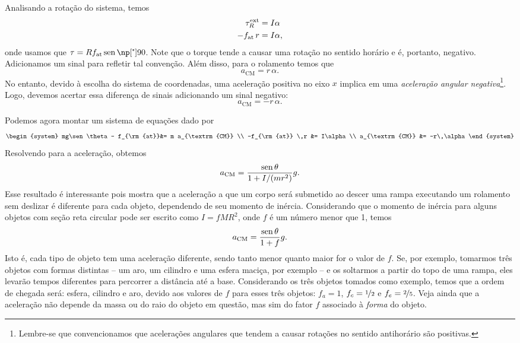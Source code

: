 Analisando a rotação do sistema, temos
\begin{align}
  \tau_R^{\rm{ext}} &= I\alpha \\
  -f_{\rm{at}} \, r &=I\alpha,
\end{align}
%
onde usamos que $\tau = R f_{\rm{at}} \sen\degree{90}$. Note que o torque tende a causar uma rotação no sentido horário e é, portanto, negativo. Adicionamos um sinal para refletir tal convenção. Além disso, para o rolamento temos que 
\begin{equation}
  a_{\textrm{CM}} = r\,\alpha.
\end{equation}
%
No entanto, devido à escolha do sistema de coordenadas, uma aceleração positiva no eixo $x$ implica em uma \emph{aceleração angular negativa}\footnote{Lembre-se que convencionamos que acelerações angulares que tendem a causar rotações no sentido antihorário são positivas.}. Logo, devemos acertar essa diferença de sinais adicionando um sinal negativo:
\begin{equation}
  a_{\textrm{CM}} = -r\,\alpha.
\end{equation}

Podemos agora montar um sistema de equações dado por
\begin{equation}
\begin{system}
    mg\sen\theta - f_{\rm{at}}&= m a_{\textrm{CM}} \\
    -f_{\rm{at}} \,r &= I\alpha \\
    a_{\textrm{CM}} &= -r\,\alpha
\end{system}
\end{equation}
%
Resolvendo para a aceleração, obtemos
\begin{equation}
  a_{\textrm{CM}} = \frac{\operatorname{sen}\theta}{1+I/(mr^2)} g.
\end{equation}
%
Esse resultado é interessante pois mostra que a aceleração a que um corpo será submetido ao descer uma rampa executando um rolamento sem deslizar é diferente para cada objeto, dependendo de seu momento de inércia. Considerando que o momento de inércia para alguns objetos com seção reta circular pode ser escrito como $I = f MR^2$, onde $f$ é um número menor que 1, temos
\begin{equation}
  a_{\textrm{CM}} = \frac{\operatorname{sen}\theta}{1+f} g.
\end{equation}
%
Isto é, cada tipo de objeto tem uma aceleração diferente, sendo tanto menor quanto maior for o valor de $f$. Se, por exemplo, tomarmos três objetos com formas distintas -- um aro, um cilindro e uma esfera maciça, por exemplo -- e os soltarmos a partir do topo de uma rampa, eles levarão tempos diferentes para percorrer a distância até a base. Considerando os três objetos tomados como exemplo, temos que a ordem de chegada será: esfera, cilindro e aro, devido aos valores de $f$ para esses três objetos: $f_a = 1$, $f_c = \nicefrac{1}{2}$ e $f_e = \nicefrac{2}{5}$. Veja ainda que a aceleração não depende da massa ou do raio do objeto em questão, mas sim do fator $f$ associado à \emph{forma} do objeto.

